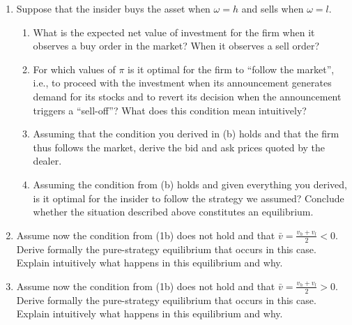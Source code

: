 	\begin{enumerate}
		\item 
		Suppose that the insider buys the asset when $\omega=h$ and sells when $\omega=l$. 
		\begin{enumerate}
			\item 
			What is the expected net value of investment for the firm when it observes a buy order in the market? When it observes a sell order? 
			
			\item 
			For which values of $\pi$ is it optimal for the firm to ``follow the market'', i.e., to proceed with the investment when its announcement generates demand for its stocks and to revert its decision when the announcement triggers a ``sell-off''? What does this condition mean intuitively?
			
			\item 
			Assuming that the condition you derived in (b) holds and that the firm thus follows the market, derive the bid and ask prices quoted by the dealer.
			
			\item 
			Assuming the condition from (b) holds and given everything you derived, is it optimal for the insider to follow the strategy we assumed? Conclude whether the situation described above constitutes an equilibrium.
		\end{enumerate}
		
		\item 
		Assume now the condition from (1b) does not hold and that $\bar{v} = \frac{v_h+v_l}{2} < 0$. Derive formally the pure-strategy equilibrium that occurs in this case. Explain intuitively what happens in this equilibrium and why.
		
		\item 
		Assume now the condition from (1b) does not hold and that $\bar{v} = \frac{v_h+v_l}{2} > 0$. Derive formally the pure-strategy equilibrium that occurs in this case. Explain intuitively what happens in this equilibrium and why.
	\end{enumerate}

